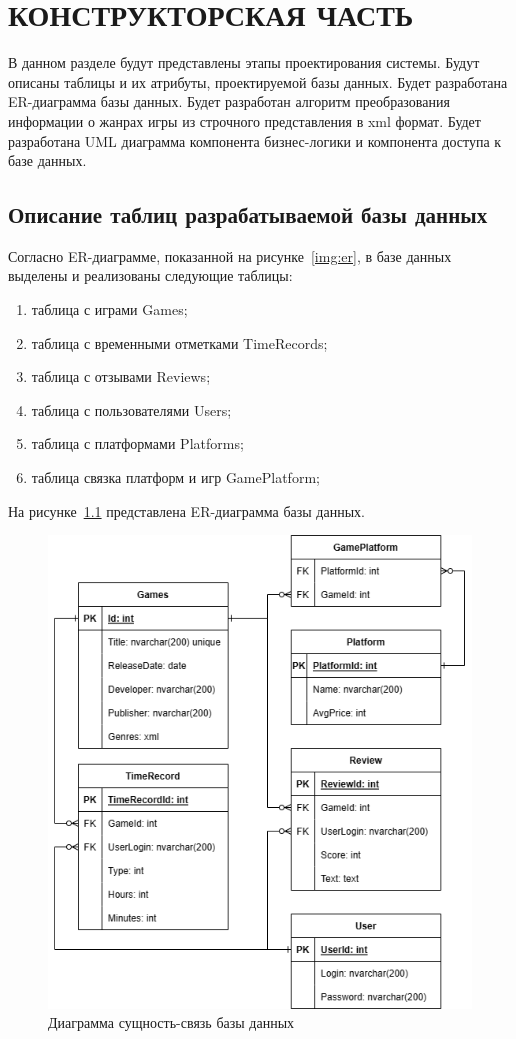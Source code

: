 \chapter{КОНСТРУКТОРСКАЯ ЧАСТЬ}

В данном разделе будут представлены этапы проектирования системы. Будут описаны таблицы и их атрибуты, проектируемой базы данных. Будет разработана ER-диаграмма базы данных. Будет разработан алгоритм преобразования информации о жанрах игры из строчного представления в xml формат. Будет разработана UML диаграмма компонента бизнес-логики и компонента доступа к базе данных.

\section{Описание таблиц разрабатываемой базы данных}

Согласно ER-диаграмме, показанной на рисунке~\ref{img:er}, в базе данных выделены и реализованы следующие таблицы:

\begin{enumerate}
	\item таблица с играми Games;
	\item таблица с временными отметками TimeRecords;
	\item таблица с отзывами Reviews;
	\item таблица с пользователями Users;
	\item таблица с платформами Platforms;
	\item таблица связка платформ и игр GamePlatform;
\end{enumerate}

На рисунке~\ref{fig:erbd} представлена ER-диаграмма базы данных.

\begin{figure}[H]
	\centering
	\includegraphics[width=0.8\linewidth]{../imgs/er_bd}
	\captionsetup{justification=centering}
	\caption{Диаграмма сущность-связь базы данных}
	\label{fig:erbd}
\end{figure}

